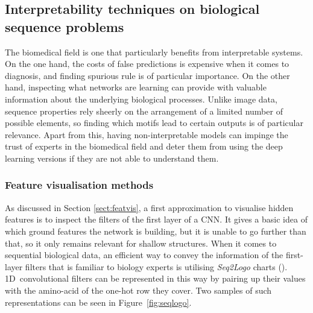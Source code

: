 
\subsection{Interpretability techniques on biological sequence problems}
The biomedical field is one that particularly benefits from interpretable systems. On the one hand, the costs of false predictions is expensive when it comes to diagnosis, and finding spurious rule is of particular importance. On the other hand, inspecting what networks are learning can provide with valuable information about the underlying biological processes. Unlike image data, sequence properties rely sheerly on the arrangement of a limited number of possible elements, so finding which motifs lead to certain outputs is of particular relevance. Apart from this, having non-interpretable models can impinge the trust of experts in the biomedical field and deter them from using the deep learning versions if they are not able to understand them.

\subsubsection*{Feature visualisation methods}
As discussed in Section \ref{sect:featvis}, a first approximation to visualise hidden features is to inspect the filters of the first layer of a CNN. It gives a basic idea of which ground features the network is building, but it is unable to go further than that, so it only remains relevant for shallow structures. When it comes to sequential biological data, an efficient way to convey the information of the first-layer filters that is familiar to biology experts is utilising \textit{Seq2Logo} charts (\cite{Thomsen2012}). 1D~convolutional filters can be represented in this way by pairing up their values with the amino-acid of the one-hot row they cover. Two samples of such representations can be seen in Figure~\ref{fig:seqlogo}.

